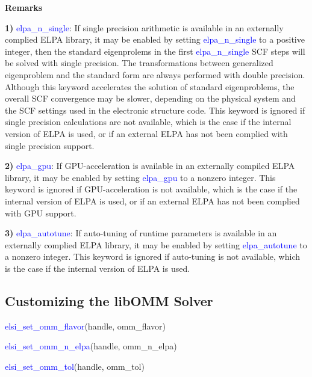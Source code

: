 \documentclass{report}
\newcommand{\tcb}[1]{\textcolor{blue}{#1}}
\begin{document}
\textbf{Remarks}

\textbf{1)} \tcb{elpa\_n\_single}: If single precision arithmetic is available in an externally complied ELPA library, it may be enabled by setting \tcb{elpa\_n\_single} to a positive integer, then the standard eigenprolems in the first \tcb{elpa\_n\_single} SCF steps will be solved with single precision. The transformations between generalized eigenproblem and the standard form are always performed with double precision. Although this keyword accelerates the solution of standard eigenproblems, the overall SCF convergence may be slower, depending on the physical system and the SCF settings used in the electronic structure code. This keyword is ignored if single precision calculations are not available, which is the case if the internal version of ELPA is used, or if an external ELPA has not been complied with single precision support.

\textbf{2)} \tcb{elpa\_gpu}: If GPU-acceleration is available in an externally compiled ELPA library, it may be enabled by setting \tcb{elpa\_gpu} to a nonzero integer. This keyword is ignored if GPU-acceleration is not available, which is the case if the internal version of ELPA is used, or if an external ELPA has not been complied with GPU support.

\textbf{3)} \tcb{elpa\_autotune}: If auto-tuning of runtime parameters is available in an externally complied ELPA library, it may be enabled by setting \tcb{elpa\_autotune} to a nonzero integer. This keyword is ignored if auto-tuning is not available, which is the case if the internal version of ELPA is used.

\subsection{Customizing the libOMM Solver}
\label{subsec:setter_omm}
\begin{labeling}{\hspace{6cm}}
\item [\hspace{0.3cm} \tcb{elsi\_set\_omm\_flavor}(handle, omm\_flavor)]
\item [\hspace{0.3cm} \tcb{elsi\_set\_omm\_n\_elpa}(handle, omm\_n\_elpa)]
\item [\hspace{0.3cm} \tcb{elsi\_set\_omm\_tol}(handle, omm\_tol)]
\end{labeling}
\end{document}
